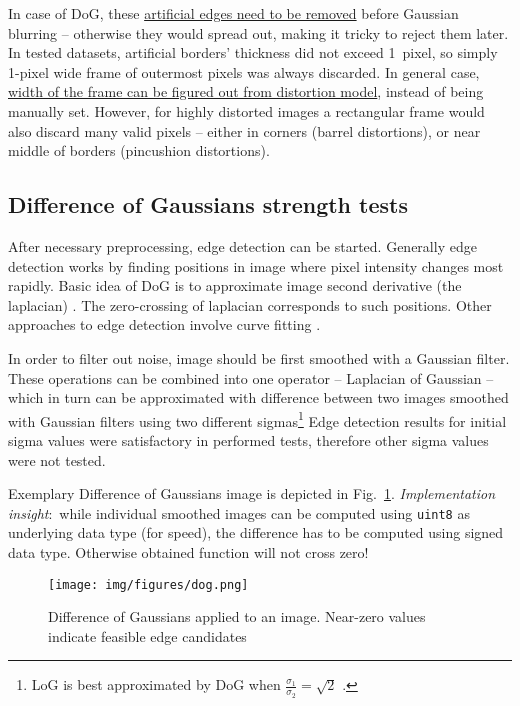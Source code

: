 In case of DoG, these \underline{artificial edges need to be removed} before Gaussian blurring -- otherwise they would spread out, making it tricky to reject them later. In tested datasets, artificial borders' thickness did not exceed 1~pixel, so simply 1-pixel wide frame of outermost pixels was always discarded. In general case, \underline{width of the frame can be figured out from distortion model}, instead of being manually set. However, for highly distorted images a rectangular frame would also discard many valid pixels -- either in corners (barrel distortions), or near middle of borders (pincushion distortions).

\subsection{Difference of Gaussians strength tests}

After necessary preprocessing, edge detection can be started. Generally edge detection works by finding positions in image where pixel intensity changes most rapidly. Basic idea of DoG is to approximate image second derivative (the laplacian) \cite{szeliski}. The zero-crossing of laplacian corresponds to such positions. Other approaches to edge detection involve curve fitting \cite{fabijanska} \cite{devernay1995non}.

In order to filter out noise, image should be first smoothed with a Gaussian filter. These operations can be combined into one operator -- Laplacian of Gaussian -- which in turn can be approximated with difference between two images smoothed with Gaussian filters using two different sigmas\footnote{LoG is best approximated by DoG when $\frac{\sigma_{1}}{\sigma_{2}} = \sqrt{2}$ \cite{sift}.} Edge detection results for initial sigma values were satisfactory in performed tests, therefore other sigma values were not tested.

Exemplary Difference of Gaussians image is depicted in Fig.~\ref{fig:dog}. \textit{Implementation insight}:~while individual smoothed images can be computed using {\tt uint8} as underlying data type (for speed), the difference has to be computed using signed data type. Otherwise obtained function will not cross zero!

\begin{figure}[ht]
	\centering\texttt{[image: img/figures/dog.png]}
	\caption{ Difference of Gaussians applied to an image. Near-zero values indicate feasible edge candidates }
	\label{fig:dog}
\end{figure}

